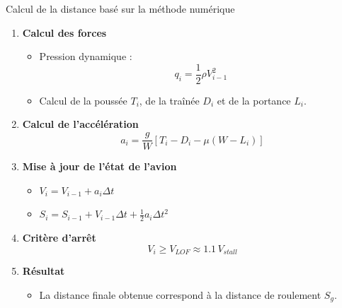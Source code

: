 			
			
			
			

			
			\begin{frame}{Calcul de la distance basé sur la méthode numérique}
				
				\begin{enumerate}
					\item \textbf{Calcul des forces}
					\begin{itemize}
						\item Pression dynamique :
						\[
						q_i=\frac{1}{2}\rho V_{i-1}^2
						\]
						
						\item Calcul de la poussée $T_i$, de la traînée $D_i$ et de la portance $L_i$.
					\end{itemize}
					
					\item \textbf{Calcul de l'accélération}
					\[
					a_i=\frac{g}{W}\left[T_i-D_i-\mu\left(W-L_i\right)\right]
					\]
					
					\item \textbf{Mise à jour de l'état de l'avion}
					\begin{itemize}
						\item $V_i = V_{i-1}+a_i\Delta t$
						\item $S_i = S_{i-1}+V_{i-1}\Delta t+\frac{1}{2}a_i\Delta t^2$
					\end{itemize}
					
					\item \textbf{Critère d'arrêt}
					\[
					V_i \geq V_{LOF}\approx 1.1\,V_{stall}
					\]
					
					\item \textbf{Résultat}
					\begin{itemize}
						\item La distance finale obtenue correspond à la distance de roulement $S_g$.
					\end{itemize}
					
				\end{enumerate}
				
			\end{frame}
			
				
		
			
			
